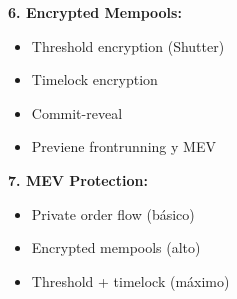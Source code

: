 \documentclass[11pt,a4paper,twoside]{book}
\theoremstyle{definition}
\theoremstyle{remark}
\begin{document}
\begin{keyidea}
\textbf{6. Encrypted Mempools:}
\begin{itemize}
    \item Threshold encryption (Shutter)
    \item Timelock encryption
    \item Commit-reveal
    \item Previene frontrunning y MEV
\end{itemize}

\textbf{7. MEV Protection:}
\begin{itemize}
    \item Private order flow (básico)
    \item Encrypted mempools (alto)
    \item Threshold + timelock (máximo)
\end{itemize}
\end{keyidea}
\end{document}
